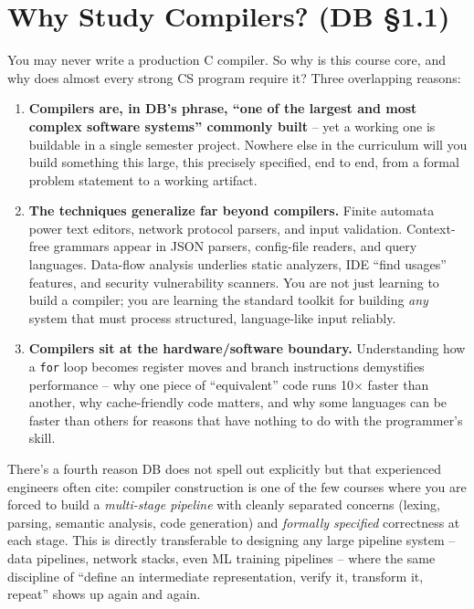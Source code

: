 \documentclass[full-course-notes.tex]{subfiles}
\begin{document}
\section{Why Study Compilers? (DB \S1.1)}
\label{sec:l1-why-study}

\dbtag You may never write a production C compiler. So why is this course core, and why does
almost every strong CS program require it? Three overlapping reasons:

\begin{enumerate}
  \item \textbf{Compilers are, in DB's phrase, ``one of the largest and most complex software
  systems'' commonly built} -- yet a working one is buildable in a single semester project.
  Nowhere else in the curriculum will you build something this large, this precisely specified,
  end to end, from a formal problem statement to a working artifact.
  \item \textbf{The techniques generalize far beyond compilers.} Finite automata power text
  editors, network protocol parsers, and input validation. Context-free grammars appear in JSON
  parsers, config-file readers, and query languages. Data-flow analysis underlies static
  analyzers, IDE ``find usages'' features, and security vulnerability scanners. You are not just
  learning to build a compiler; you are learning the standard toolkit for building \emph{any}
  system that must process structured, language-like input reliably.
  \item \textbf{Compilers sit at the hardware/software boundary.} Understanding how a
  \texttt{for} loop becomes register moves and branch instructions demystifies performance --
  why one piece of ``equivalent'' code runs 10$\times$ faster than another, why cache-friendly
  code matters, and why some languages can be faster than others for reasons that have nothing to
  do with the programmer's skill.
\end{enumerate}

\begin{enrichment}
There's a fourth reason DB does not spell out explicitly but that experienced engineers often
cite: compiler construction is one of the few courses where you are forced to build a
\emph{multi-stage pipeline} with cleanly separated concerns (lexing, parsing, semantic
analysis, code generation) and \emph{formally specified} correctness at each stage. This is
directly transferable to designing any large pipeline system -- data pipelines, network stacks,
even ML training pipelines -- where the same discipline of ``define an intermediate
representation, verify it, transform it, repeat'' shows up again and again.
\end{enrichment}
\end{document}
